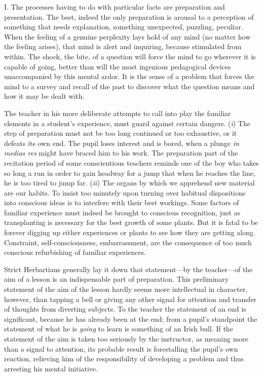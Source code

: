\documentclass[letterpaper]{book}
\begin{document}

I. The processes having to do with particular facts are preparation and
presentation. The best, indeed the only preparation is arousal to a
perception of something that needs explanation, something unexpected,
puzzling, peculiar. When the feeling of a genuine perplexity lays hold
of any mind (no matter how the feeling arises), that mind is alert and
inquiring, because stimulated from within. The shock, the bite, of a
question will force the mind to go wherever it is capable of going,
better than will the most ingenious pedagogical devices unaccompanied by
this mental ardor. It is the sense of a problem that forces the mind to
a survey and recall of the past to discover what the question means and
how it may be dealt with.


The teacher in his more deliberate attempts to call into play the
familiar elements in a student's experience, must guard against certain
dangers. (\emph{i}) The step of preparation must not be too long
continued or too exhaustive, or it defeats its own end. The pupil loses
interest and is bored, when a plunge \emph{in medias res} might have
braced him to his work. The preparation part of the recitation period of
some conscientious teachers reminds one of the boy who takes so long a
run in order to gain headway for a jump that when he reaches the line,
he is too tired to jump far. (\emph{ii}) The organs by which we
apprehend new material are our habits. To insist too minutely upon
turning over habitual dispositions into conscious ideas is to interfere
with their best workings. Some factors of familiar experience must
indeed be brought to conscious recognition, just as
transplanting
is necessary for the best growth of some plants. But it is fatal to be
forever digging up either experiences or plants to see how they are
getting along. Constraint, self-consciousness, embarrassment, are the
consequence of too much conscious refurbishing of familiar experiences.


Strict Herbartians generally lay it down that statement---by the
teacher---of the aim of a lesson is an indispensable part of
preparation. This preliminary statement of the aim of the lesson hardly
seems more intellectual in character, however, than tapping a bell or
giving any other signal for attention and transfer of thoughts from
diverting subjects. To the teacher the statement of an end is
significant, because he has already been at the end; from a pupil's
standpoint the statement of what he is \emph{going} to learn is
something of an Irish bull. If the statement of the aim is taken too
seriously by the instructor, as meaning more than a signal to attention,
its probable result is forestalling the pupil's own reaction, relieving
him of the responsibility of developing a problem and thus arresting his
mental initiative.
\end{document}
